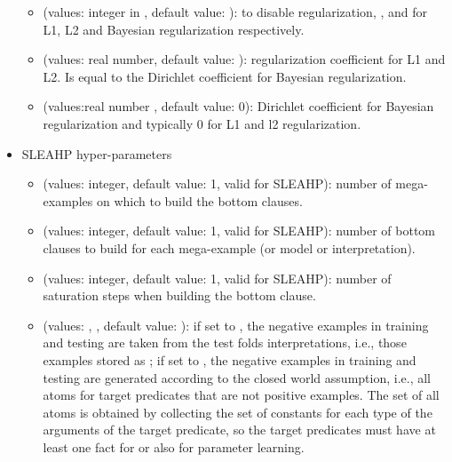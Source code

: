 \documentclass[letterpaper,10pt,english]{sphinxmanual}
\begin{document}
\begin{itemize}
\begin{itemize}
\item {} 
 (values: integer in \sphinxcode{{[}0,3{]}} , default value: ):   to disable regularization, ,  and  for L1, L2 and Bayesian regularization respectively.

\item {} 
 (values: real number, default value: ): regularization coefficient for L1 and L2. Is equal to the Dirichlet coefficient  for Bayesian regularization.

\item {} 
 (values:real number , default value: 0): Dirichlet coefficient  for Bayesian regularization and typically 0 for L1 and l2 regularization.

\end{itemize}

\item {} 
SLEAHP hyper-parameters
\begin{itemize}
\item {} 
 (values: integer, default value: 1, valid for SLEAHP): number of mega-examples on which to build the bottom clauses.

\item {} 
 (values: integer, default value: 1, valid for SLEAHP): number of bottom clauses to build for each mega-example (or model or interpretation).

\item {} 
 (values: integer, default value: 1, valid for SLEAHP): number of saturation steps when building the bottom clause.

\item {} 
 (values: , , default value: ): if set to , the negative examples in training and testing are taken from the test folds interpretations, i.e., those examples  stored as ; if set to , the negative examples in training and testing are generated according to the closed world assumption, i.e., all atoms for target predicates that are not positive examples. The set of all atoms is obtained by collecting the set of constants for each type of the arguments of the target predicate, so the target predicates must have at least one fact for  or  also for parameter learning.


\end{itemize}
\end{itemize}
\end{document}
